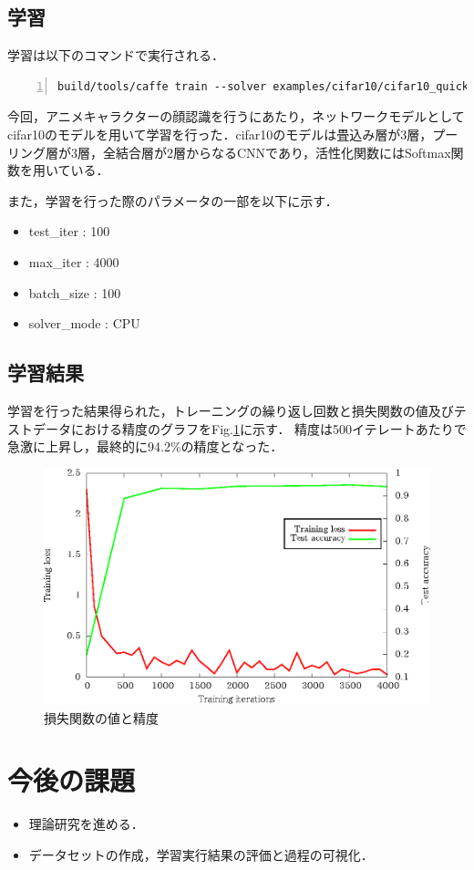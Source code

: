 \documentclass[a4paper,10pt]{jsarticle}
\begin{document}
\subsection{学習}
学習は以下のコマンドで実行される．

\begin{lstlisting}[basicstyle=\ttfamily\footnotesize, frame=single, tabsize=2,showtabs,firstnumber=1, numbers=left, breaklines=true]
build/tools/caffe train --solver examples/cifar10/cifar10_quick_solver.prototxt
\end{lstlisting}

今回，アニメキャラクターの顔認識を行うにあたり，ネットワークモデルとしてcifar10のモデルを用いて学習を行った．cifar10のモデルは畳込み層が3層，プーリング層が3層，全結合層が2層からなるCNNであり，活性化関数にはSoftmax関数を用いている．

また，学習を行った際のパラメータの一部を以下に示す．
\begin{itemize}
 \item test\_iter : 100
 \item max\_iter : 4000
 \item batch\_size : 100
 \item solver\_mode : CPU
\end{itemize}

\subsection{学習結果}
学習を行った結果得られた，トレーニングの繰り返し回数と損失関数の値及びテストデータにおける精度のグラフをFig.\ref{210045_15Jul15}に示す．
精度は500イテレートあたりで急激に上昇し，最終的に94.2\%の精度となった．

\begin{figure}[ht]
 \centering
 \includegraphics[scale=1.0]{fig/eps/result_train_test_graph.eps}
 \caption{損失関数の値と精度 }
 \label{210045_15Jul15}
\end{figure}

\section{今後の課題}
\begin{itemize}
 \item 理論研究を進める．
 \item データセットの作成，学習実行結果の評価と過程の可視化．
\end{itemize}
\end{document}
